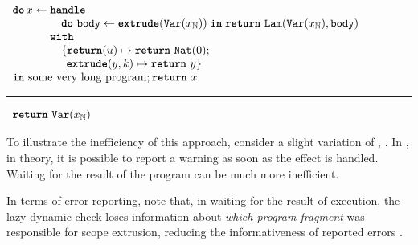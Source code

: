 \begin{code}
  \begin{efflst}
    $\begin{array}{l}
      \textbf{\texttt{do}} \,  x \leftarrow \textbf{\texttt{handle}} \\
      \quad \quad \quad \quad \,\, \texttt{\textbf{do}} \,\, {\texttt{body}} \leftarrow {\textbf{\texttt{extrude}}({\texttt{Var}(x_{\mathbb{N}})})} \; \textbf{\texttt{in}} \; {\texttt{\textbf{return}} \,\, {\texttt{Lam}(\texttt{Var}(x_{\mathbb{N}}), \texttt{body})}} \\
      \quad \quad \quad \,\, \textbf{\texttt{with}} \\
      \quad \quad \quad \quad \, \, \{ \textbf{\texttt{return}}(u) \mapsto {\texttt{\textbf{return}} \,\, {\texttt{Nat}(0)}}; \\
      \quad \quad \quad \quad \, \, \; \, \textbf{\texttt{extrude}}(y, k) \mapsto {\texttt{\textbf{return}} \,\, {y}}\}\\
      \textbf{\texttt{in}} \text{ some very long program}; \texttt{\textbf{return}} \,\, {x}
    \end{array}$

    \vspace{2mm} 
\textcolor{effComment}{\hrule height 0.2mm \relax}
\vspace{2mm} 

\textcolor{effComment}{$\begin{array}{l}\texttt{\textbf{return}} \,\, {\texttt{Var}(x_{\mathbb{N}})}\end{array}$}

\end{efflst}
%
\label{listing:efflang-lazy-scope-extrusion-inefficient}
\end{code}

To illustrate the inefficiency of this approach, consider a slight variation of , . In , in theory, it is possible to report a warning as soon as the effect is handled. Waiting for the result of the program can be much more inefficient. 

In terms of error reporting, note that, in waiting for the result of execution, the lazy dynamic check loses information about \textit{which program fragment} was responsible for scope extrusion, reducing the informativeness of reported errors \citep{kiselyov-14}.  

